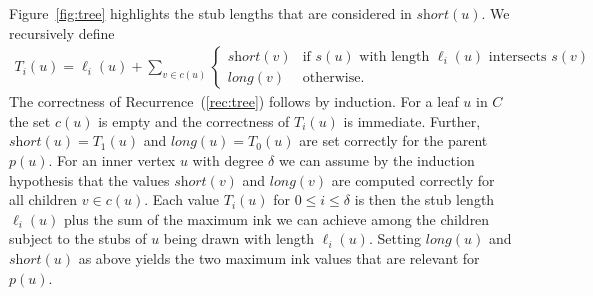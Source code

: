 \documentclass[a4paper,english,numberwithinsect]{eurocg18}
\newcommand{\maxsped}{\ensuremath{\textsc{MaxSPED}}\xspace}
\newcommand{\sollong}{\ensuremath{\textit{long}}\xspace}
\newcommand{\solshort}{\ensuremath{\textit{short}}\xspace}
\begin{document}
Figure~\ref{fig:tree} highlights the stub lengths that are considered in $\solshort(u)$. We recursively define %
\begin{align}
	\label{rec:tree}
	T_i(u) = \ell_i(u) + \sum_{v \in c(u)}
	\begin{cases}
		\solshort(v) & \text{if } s(u) \text{ with length } \ell_i(u) \text{ intersects } s(v) \\
		\sollong(v) & \text{otherwise.}
	\end{cases}
\end{align}
The correctness of Recurrence~(\ref{rec:tree}) follows by induction. 
For a leaf $u$ in $C$ the set $c(u)$ is empty and the correctness of $T_i(u)$ is immediate.
Further, $\solshort(u) = T_1(u)$ and $\sollong(u) = T_0(u)$ are set correctly for the parent $p(u)$.
For an inner vertex $ u $ with degree $\delta$ we can assume by the induction hypothesis that the values $ \solshort(v) $ and $ \sollong(v) $ are computed correctly for all children $ v \in c(u) $. 
Each value $ T_i(u) $ for $ 0 \leq i \leq \delta $ is then the stub length $ \ell_i(u) $ plus the sum of the maximum ink we can achieve among the children subject to the stubs of $u$ being drawn with length $\ell_i(u)$. 
Setting $ \sollong(u) $ and $ \solshort(u) $ as above yields the two maximum ink values that are relevant for $ p(u) $.
\end{document}
